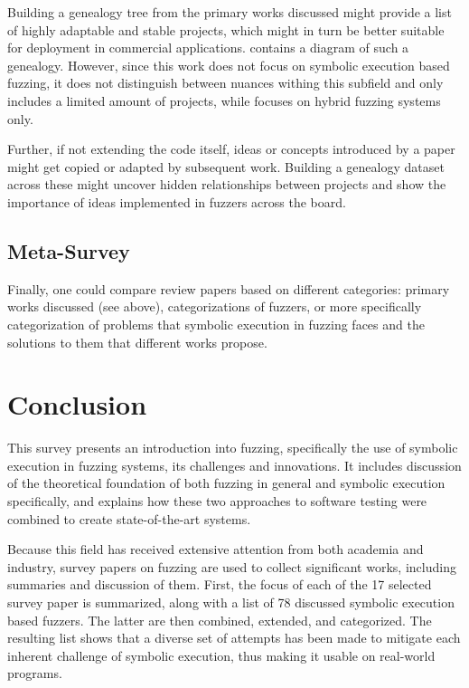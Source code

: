 \documentclass{article}
\begin{document}
\begin{multicols}{2}
    Building a genealogy tree from the primary works discussed might provide a list of highly adaptable and stable projects, which might in turn be better suitable for deployment in commercial applications. \cite{ArtScienceEng} contains a diagram of such a genealogy. However, since this work does not focus on symbolic execution based fuzzing, it does not distinguish between nuances withing this subfield and only includes a limited amount of projects, while \cite{Hybrid} focuses on hybrid fuzzing systems only.

    Further, if not extending the code itself, ideas or concepts introduced by a paper might get copied or adapted by subsequent work. Building a genealogy dataset across these might uncover hidden relationships between projects and show the importance of ideas implemented in fuzzers across the board.

    \subsection{Meta-Survey}
    Finally, one could compare review papers based on different categories: primary works discussed (see above), categorizations of fuzzers, or more specifically categorization of problems that symbolic execution in fuzzing faces and the solutions to them that different works propose.

    \section{Conclusion}
    \label{Conclusion}
    This survey presents an introduction into fuzzing, specifically the use of symbolic execution in fuzzing systems, its challenges and innovations. It includes discussion of the theoretical foundation of both fuzzing in general and symbolic execution specifically, and explains how these two approaches to software testing were combined to create state-of-the-art systems.

    Because this field has received extensive attention from both academia and industry, survey papers on fuzzing are used to collect significant works, including summaries and discussion of them. First, the focus of each of the 17 selected survey paper is summarized, along with a list of 78 discussed symbolic execution based fuzzers. The latter are then combined, extended, and categorized. The resulting list shows that a diverse set of attempts has been made to mitigate each inherent challenge of symbolic execution, thus making it usable on real-world programs.


\end{multicols}
\end{document}
